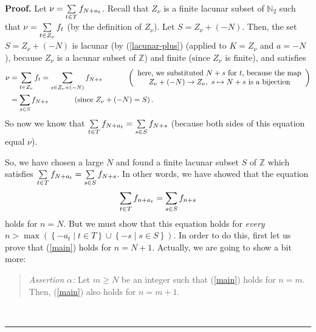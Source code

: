 \documentclass[numbers=enddot,12pt,final,onecolumn,notitlepage]{scrartcl}%
\numberwithin{exer}{section}
\theoremstyle{definition}
\newenvironment{statement}{\begin{quote}}{\end{quote}}
\newenvironment{proof}[1][Proof]{\noindent\textbf{#1.} }{\ \rule{0.5em}{0.5em}}
\let\sumnonlimits\sum
\renewcommand{\sum}{\sumnonlimits\limits}
\begin{document}
\begin{proof}
Let $\nu=\sum\limits_{t\in T}f_{N+a_{t}}$. Recall that $Z_{\nu}$ is a finite
lacunar subset of $\mathbb{N}_{2}$ such that $\nu=\sum\limits_{t\in Z_{\nu}%
}f_{t}$ (by the definition of $Z_{\nu}$). Let $S=Z_{\nu}+\left(  -N\right)  $.
Then, the set $S=Z_{\nu}+\left(  -N\right)  $ is lacunar (by
(\ref{lacunar-plus}) (applied to $K=Z_{\nu}$ and $a=-N$), because $Z_{\nu}$ is
a lacunar subset of $\mathbb{Z}$) and finite (since $Z_{\nu}$ is finite), and
satisfies%
\begin{align*}
\nu &  =\sum\limits_{t\in Z_{\nu}}f_{t}=\sum\limits_{s\in Z_{\nu}+\left(
-N\right)  }f_{N+s}\ \ \ \ \ \ \ \ \ \ \left(
\begin{array}
[c]{c}%
\text{here, we substituted }N+s\text{ for }t\text{, because the map}\\
Z_{\nu}+\left(  -N\right)  \rightarrow Z_{\nu},\text{ }s\mapsto N+s\text{ is a
bijection}%
\end{array}
\right) \\
&  =\sum\limits_{s\in S}f_{N+s}\ \ \ \ \ \ \ \ \ \ \left(  \text{since }%
Z_{\nu}+\left(  -N\right)  =S\right)  .
\end{align*}
So now we know that $\sum\limits_{t\in T}f_{N+a_{t}}=\sum\limits_{s\in
S}f_{N+s}$ (because both sides of this equation equal $\nu$).

So, we have chosen a large $N$ and found a finite lacunar subset $S$ of
$\mathbb{Z}$ which satisfies $\sum\limits_{t\in T}f_{N+a_{t}}=\sum
\limits_{s\in S}f_{N+s}$. In other words, we have showed that the equation
\begin{equation}
\sum\limits_{t\in T}f_{n+a_{t}}=\sum\limits_{s\in S}f_{n+s} \label{main}%
\end{equation}
holds for $n=N$. But we must show that this equation holds for \textit{every}
$n>\max\left(  \left\{  -a_{t}\mid t\in T\right\}  \cup\left\{  -s\mid s\in
S\right\}  \right)  $. In order to do this, first let us prove that
(\ref{main}) holds for $n=N+1$. Actually, we are going to show a bit more:

\begin{statement}
\textit{Assertion }$\alpha$\textit{:} Let $m\geq N$ be an integer such that
(\ref{main}) holds for $n=m$. Then, (\ref{main}) also holds for $n=m+1$.
\end{statement}


\end{proof}
\end{document}
